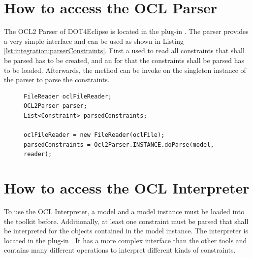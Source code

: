 \section{How to access the OCL Parser}
The \acs{OCL}2 Parser of \acl{DOT4Eclipse} is located in the plug-in . The parser provides a very simple interface and can be used as shown in Listing \ref{lst:integration:parserConstraints}. First a  used to read all constraints that shall be parsed has to be created, and an  for that the constraints shall be parsed has to be loaded. Afterwards, the method  can be invoke on the singleton instance of the parser to parse the constraints.

\begin{figure}[!b]
\begin{lstlisting}[caption={How to parse constraints.}, captionpos=b, label=lst:integration:parserConstraints]
FileReader oclFileReader;
OCL2Parser parser;
List<Constraint> parsedConstraints;

oclFileReader = new FileReader(oclFile);
parsedConstraints = Ocl2Parser.INSTANCE.doParse(model, reader);
\end{lstlisting}
\end{figure}



\section{How to access the OCL Interpreter}

To use the \acs{OCL} Interpreter, a model and a model instance must be loaded 
into the toolkit before. Additionally, at least one constraint must be parsed 
that shall be interpreted for the objects contained in the model instance. The 
interpreter is located in the plug-in 
. It has a more 
complex interface than the other tools and contains many different operations 
to interpret different kinds of constraints.

